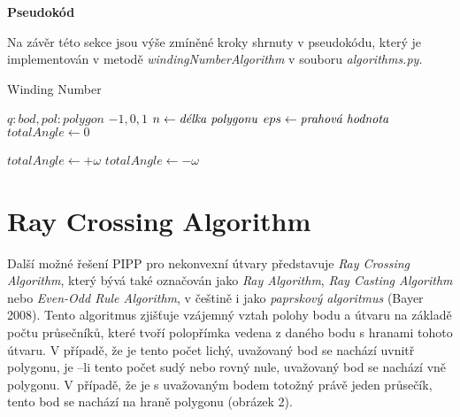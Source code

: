 \vfill
\par {\large\textbf{Pseudokód} }
\par Na závěr této sekce jsou výše zmíněné kroky shrnuty v pseudokódu, který je implementován v metodě \emph{windingNumberAlgorithm} v souboru \emph{algorithms.py}.
\vfill

\begin{algorithm}[h]
\caption{ Winding Number}\label{alg:cap}
\begin{algorithmic}
\Require $q: bod, pol: polygon$
\Ensure $-1 ,0 ,1$
\State $n \gets {\text{\emph{délka polygonu}}}$
\State $eps \gets {\text{\emph{prahová hodnota}}}$ 
\State $totalAngle \gets 0$ 
    \EndIf


        \State $totalAngle \gets +{\text{$\omega$}}$
        \State $totalAngle \gets -{\text{$\omega$}}$
    \EndIf
         
    \EndIf
\EndFor
{}
     
\Else{} 
     
\EndIf
\end{algorithmic}
\end{algorithm}

\newpage

\section*{Ray Crossing Algorithm}
\par Další možné řešení PIPP pro nekonvexní útvary představuje \emph{Ray Crossing Algorithm}, který bývá také označován jako \emph{Ray Algorithm}, \emph{Ray Casting Algorithm} nebo \emph{Even-Odd Rule Algorithm}, v češtině i jako \emph{paprskový algoritmus} (Bayer 2008). Tento algoritmus zjišťuje vzájemný vztah polohy bodu a útvaru na základě počtu průsečníků, které tvoří polopřímka vedena z daného bodu s hranami tohoto útvaru. V případě, že je tento počet lichý, uvažovaný bod se nachází uvnitř polygonu, je –li tento počet sudý nebo rovný nule, uvažovaný bod se nachází vně polygonu. V případě, že je s uvažovaným bodem totožný právě jeden průsečík, tento bod se nachází na hraně polygonu (obrázek 2).

